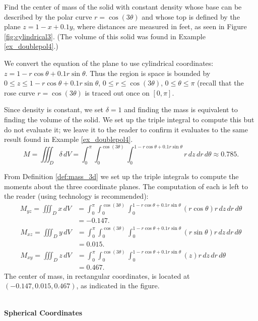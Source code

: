 {Find the center of mass of the solid with constant density whose base can be described by the polar curve $r=\cos(3\theta)$ and whose top is defined by the plane $z=1-x+0.1y$, where distances are measured in feet, as seen in Figure \ref{fig:cylindrical3}. (The volume of this solid was found in Example \ref{ex_doublepol4}.)
}
{We convert the equation of the plane to use cylindrical coordinates: $z= 1-r\cos\theta+0.1r\sin\theta$. Thus the region is space is bounded by $0 \leq z \leq 1-r\cos\theta + 0.1r\sin\theta$, $0 \leq r \leq \cos(3\theta)$, $0 \leq \theta \leq \pi$ (recall that the rose curve $r=\cos(3\theta)$ is traced out once on $[0,\pi]$.

Since density is constant, we set $\delta = 1$ and finding the mass is equivalent to finding the volume of the solid. We set up the triple integral to compute this but do not evaluate it; we leave it to the reader to confirm it evaluates to the same result found in Example \ref{ex_doublepol4}.
$$M = \iiint_D\delta \, dV = \int_0^{\pi}\int_0^{\cos(3\theta)}\int_0^{1-r\cos\theta+0.1r\sin\theta} r\,dz\,dr\,d\theta \approx 0.785.$$

From Definition \ref{def:mass_3d} we set up the triple integrals to compute the moments about the three coordinate planes. The computation of each is left to the reader (using technology is recommended):
\begin{align*}
M_{yz} = \iiint_D x\,dV &= \int_0^{\pi}\int_0^{\cos(3\theta)}\int_0^{1-r\cos\theta+0.1r\sin\theta} (r\cos\theta) r\,dz\,dr\,d\theta\\
&= -0.147.
\end{align*}
\begin{align*}
M_{xz} = \iiint_D y\,dV &= \int_0^{\pi}\int_0^{\cos(3\theta)}\int_0^{1-r\cos\theta+0.1r\sin\theta} (r\sin\theta) r\,dz\,dr\,d\theta\\
&= 0.015.\\
M_{xy} = \iiint_D z\,dV &= \int_0^{\pi}\int_0^{\cos(3\theta)}\int_0^{1-r\cos\theta+0.1r\sin\theta} (z) r\,dz\,dr\,d\theta\\
 &= 0.467.
\end{align*}
The center of mass, in rectangular coordinates,  is located at $(-0.147,0.015,0.467)$, as indicated in the figure.
}\\

\noindent\textbf{\large Spherical Coordinates}

